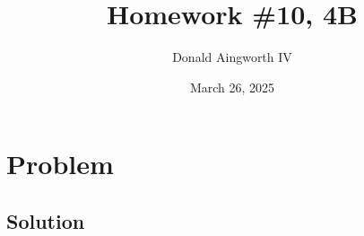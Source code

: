 \documentclass[12pt]{article}
\title{Homework \#10, 4B}
\author{Donald Aingworth IV}
\date{March 26, 2025}
\begin{document}

\maketitle

\pagebreak
\section{Problem }


\subsection*{Solution}


\pagebreak
\end{document}
